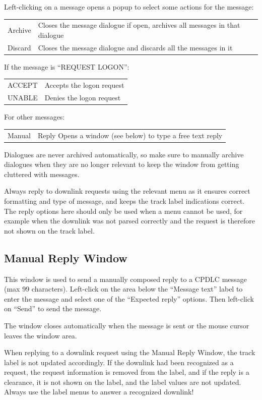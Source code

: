 \documentclass[11pt,a4paper,oldfontcommands]{memoir}
\newenvironment{Warn}
  {\begin{shaded}\marginnote{\fbox{Warning}}}
  {\end{shaded}}
\begin{document}
Left-clicking on a message opens a popup to select some actions for the message:

\begin{tabular}{l l}
    Archive & Closes the message dialogue if open, archives all messages in that dialogue\\
    Discard & Closes the message dialogue and discards all the messages in it\\
\end{tabular}

If the message is “REQUEST LOGON”:

\begin{tabular}{l l}
    ACCEPT & Accepts the logon request\\
    UNABLE & Denies the logon request\\
\end{tabular}

For other messages:

\begin{tabular}{l l}
    Manual & Reply Opens a window (see below) to type a free text reply\\
\end{tabular}

Dialogues are never archived automatically, so make sure to manually archive dialogues when they are no longer relevant to keep the window from getting cluttered with messages.

Always reply to downlink requests using the relevant menu as it ensures correct formatting and type of message, and keeps the track label indications correct. The reply options here should only be used when a menu cannot be used, for example when the downlink was not parsed correctly and the request is therefore not shown on the track label.

\subsection{Manual Reply Window}
\label{win:dlmrw}

This window is used to send a manually composed reply to a CPDLC message (max 99 characters). Left-click on the area below the “Message text” label to enter the message and select one of the “Expected reply” options. Then left-click on “Send” to send the message.

The window closes automatically when the message is sent or the mouse cursor leaves the window area.

\begin{Warn}
    When replying to a downlink request using the Manual Reply Window, the track label is not updated accordingly. If the downlink had been recognized as a request, the request information is removed from the label, and if the reply is a clearance, it is not shown on the label, and the label values are not updated. Always use the label menus to answer a recognized downlink!
\end{Warn}
\end{document}
